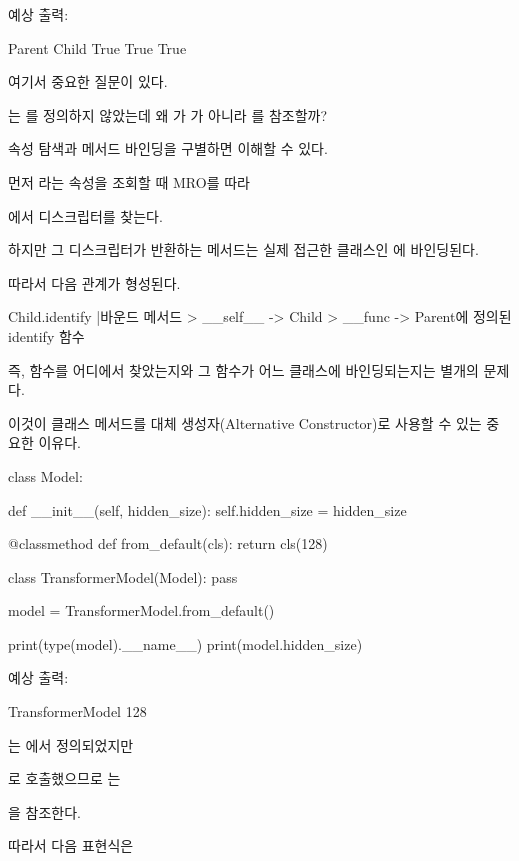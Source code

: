 예상 출력:

\begin{dhkzsh}
Parent
Child
True
True
True
\end{dhkzsh}

여기서 중요한 질문이 있다.

는 를 정의하지 않았는데 왜 가 가 아니라 를 참조할까?

속성 탐색과 메서드 바인딩을 구별하면 이해할 수 있다.

먼저 라는 속성을 조회할 때 MRO를 따라 

에서  디스크립터를 찾는다.

하지만 그 디스크립터가 반환하는 메서드는 실제 접근한 클래스인 에 바인딩된다.

따라서 다음 관계가 형성된다.

\begin{dhkdir}[in=6]
Child.identify
|바운드 메서드
> __self__ -> Child
> __func -> Parent에 정의된 identify 함수
\end{dhkdir}

즉, 함수를 어디에서 찾았는지와 그 함수가 어느 클래스에 바인딩되는지는 별개의 문제다.

이것이 클래스 메서드를 대체 생성자(Alternative Constructor)로 사용할 수 있는 중요한 이유다.

\begin{dhkcode}
class Model:

    def __init__(self, hidden_size):
        self.hidden_size = hidden_size

    @classmethod
    def from_default(cls):
        return cls(128)


class TransformerModel(Model):
    pass


model = TransformerModel.from_default()

print(type(model).__name__)
print(model.hidden_size)
\end{dhkcode}

예상 출력:

\begin{dhkzsh}
TransformerModel
128
\end{dhkzsh}

는 에서 정의되었지만

로 호출했으므로 는

을 참조한다.

따라서 다음 표현식은

